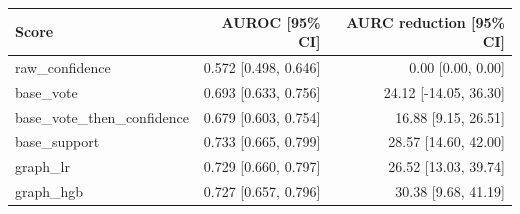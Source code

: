 \begin{tabular}{lrr}
\hline
Score & AUROC [95\% CI] & AURC reduction [95\% CI] \\
\hline
raw\_confidence & 0.572 [0.498, 0.646] & 0.00 [0.00, 0.00] \\
base\_vote & 0.693 [0.633, 0.756] & 24.12 [-14.05, 36.30] \\
base\_vote\_then\_confidence & 0.679 [0.603, 0.754] & 16.88 [9.15, 26.51] \\
base\_support & 0.733 [0.665, 0.799] & 28.57 [14.60, 42.00] \\
graph\_lr & 0.729 [0.660, 0.797] & 26.52 [13.03, 39.74] \\
graph\_hgb & 0.727 [0.657, 0.796] & 30.38 [9.68, 41.19] \\
\hline
\end{tabular}
